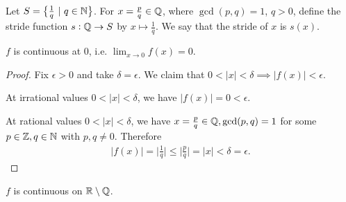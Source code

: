 \documentclass[12pt]{article}
\begin{document}
\begin{definition*}[Stride]
  Let $S = \big\{\frac{1}{q} ~|~ q \in \mathbb{N}\big\}$. For $x = \frac{p}{q} \in \mathbb{Q}$, where
  $\gcd(p, q) = 1$, $q > 0$, define the stride function $s:\mathbb{Q}\to S$ by $x \mapsto \frac{1}{q}$. We
  say that the stride of $x$ is $s(x)$.
\end{definition*}


\begin{claim*}
  $f$ is continuous at $0$, i.e. $\lim_{x \to 0}f(x) = 0$.
\end{claim*}

\begin{proof}
  Fix $\epsilon > 0$ and take $\delta = \epsilon$. We claim that
  $0 < |x| < \delta \implies |f(x)| < \epsilon$.

  At irrational values $0 < |x| < \delta$, we have $|f(x)| = 0 < \epsilon$.

  At rational values $0 < |x| < \delta$, we have $x = \frac{p}{q} \in \mathbb{Q}, \gcd(p, q) = 1$ for some
  $p \in \mathbb{Z}, q \in \mathbb{N}$ with $p, q \neq 0$. Therefore
  \begin{align*}
    |f(x)| = \Big|\frac{1}{q}\Big| \leq \Big|\frac{p}{q}\Big| = |x| < \delta = \epsilon.
  \end{align*}
\end{proof}

\begin{claim*}
  $f$ is continuous on $\mathbb{R}\setminus\mathbb{Q}$.
\end{claim*}
\end{document}
